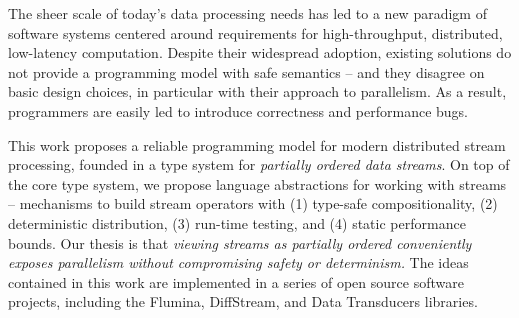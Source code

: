 The sheer scale of today's data processing needs has led to a new paradigm of software systems centered around requirements for high-throughput, distributed, low-latency computation.
Despite their widespread adoption, existing solutions do not provide a programming model with safe semantics -- and they disagree on basic design choices, in particular with their approach to parallelism. As a result, \naive{} programmers are easily led to introduce correctness and performance bugs.

This work proposes a reliable programming model for modern distributed stream processing, founded in a type system for \emph{partially ordered data streams}. On top of the core type system, we propose language abstractions for working with streams -- mechanisms to build stream operators with (1) type-safe compositionality, (2) deterministic distribution, (3) run-time testing, and (4) static performance bounds. Our thesis is that \emph{viewing streams as partially ordered conveniently exposes parallelism without compromising safety or determinism.} The ideas contained in this work are implemented in a series of open source software projects, including the Flumina, DiffStream, and Data Transducers libraries.
